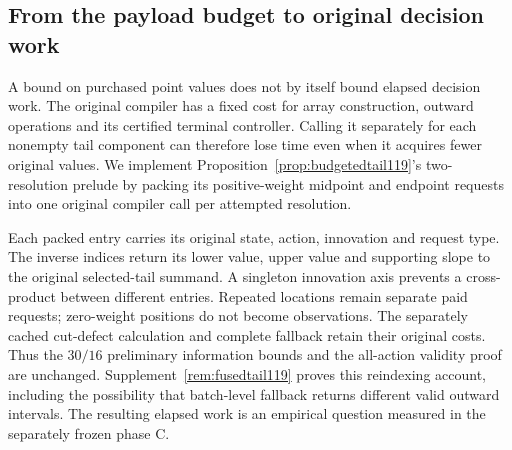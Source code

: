 \subsection{From the payload budget to original decision work}\label{sec:packing119}
A bound on purchased point values does not by itself bound elapsed decision
work. The original compiler has a fixed cost for array construction, outward
operations and its certified terminal controller. Calling it separately for
each nonempty tail component can therefore lose time even when it acquires
fewer original values. We implement Proposition~\ref{prop:budgetedtail119}'s
two-resolution prelude by packing its positive-weight midpoint and endpoint
requests into one original compiler call per attempted resolution.

Each packed entry carries its original state, action, innovation and request
type. The inverse indices return its lower value, upper value and supporting
slope to the original selected-tail summand. A singleton innovation axis
prevents a cross-product between different entries. Repeated locations remain
separate paid requests; zero-weight positions do not become observations.
The separately cached cut-defect calculation and complete fallback retain
their original costs. Thus the $30/16$ preliminary information bounds and
the all-action validity proof are unchanged. Supplement~\ref{rem:fusedtail119}
proves this reindexing account, including the possibility that batch-level
fallback returns different valid outward intervals. The resulting elapsed
work is an empirical question measured in the separately frozen phase C.
